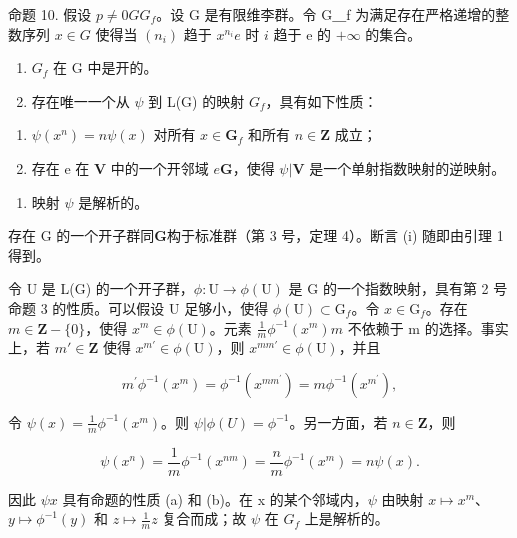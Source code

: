 命题 10. 假设 \(p \neq 0\)\(G\)\(G_f\)。设 G 是有限维李群。令 G＿f 为满足存在严格递增的整数序列 \(x \in G\) 使得当 \((n_i)\) 趋于 \(x^{n_i}\)\(e\) 时 \(i\) 趋于 e 的 \(+\infty\) 的集合。

\begin{enumerate}
\def\labelenumi{(\roman{enumi})}
\item
  \(G_{f}\) 在 G 中是开的。
\item
  存在唯一一个从 \(\psi\) 到 L(G) 的映射 \(G_{f}\)，具有如下性质：
\end{enumerate}

\begin{enumerate}
\def\labelenumi{(\alph{enumi})}
\item
  \(\psi (x^n) = n\psi (x)\) 对所有 \(x\in \mathbf{G}_f\) 和所有 \(n\in \mathbf{Z}\) 成立；
\item
  存在 e 在 \(\mathbf{V}\) 中的一个开邻域 \(e\)\(\mathbf{G}\)，使得 \(\psi |\mathbf{V}\) 是一个单射指数映射的逆映射。
\end{enumerate}

\begin{enumerate}
\def\labelenumi{(\roman{enumi})}
\setcounter{enumi}{2}
\tightlist
\item
  映射 \(\psi\) 是解析的。
\end{enumerate}

存在 G 的一个开子群同\(\mathbf{G}\)构于标准群（第 3 号，定理 4）。断言 (i) 随即由引理 1 得到。

令 U 是 L(G) 的一个开子群，\(\phi\colon\mathrm{U}\to\phi(\mathrm{U})\) 是 G 的一个指数映射，具有第 2 号命题 3 的性质。可以假设 U 足够小，使得 \(\phi(\mathrm{U})\subset\mathrm{G}_{f}\)。令 \(x\in\mathrm{G}_{f}\)。存在 \(m\in\mathbf{Z}-\{0\}\)，使得 \(x^{m}\in\phi(\mathrm{U})\)。元素 \(\frac{1}{m}\phi^{-1}(x^{m})\)\(m\) 不依赖于 m 的选择。事实上，若 \(m'\in\mathbf{Z}\) 使得 \(x^{m'}\in\phi(\mathrm{U})\)，则 \(x^{mm'}\in\phi(\mathrm{U})\)，并且

\[
m ^ {\prime} \phi^ {- 1} (x ^ {m}) = \phi^ {- 1} (x ^ {m m ^ {\prime}}) = m \phi^ {- 1} (x ^ {m ^ {\prime}}),
\]

令 \(\psi(x) = \frac{1}{m}\phi^{-1}(x^m)\)。则 \(\psi|\phi(U) = \phi^{-1}\)。另一方面，若 \(n \in \mathbf{Z}\)，则

\[
\psi (x ^ {n}) = \frac {1}{m} \phi^ {- 1} (x ^ {n m}) = \frac {n}{m} \phi^ {- 1} (x ^ {m}) = n \psi (x).
\]

因此 \(\psi\)\(x\) 具有命题的性质 (a) 和 (b)。在 x 的某个邻域内，\(\psi\) 由映射 \(x \mapsto x^m\)、\(y \mapsto \phi^{-1}(y)\) 和 \(z \mapsto \frac{1}{m} z\) 复合而成；故 \(\psi\) 在 \(G_f\) 上是解析的。

